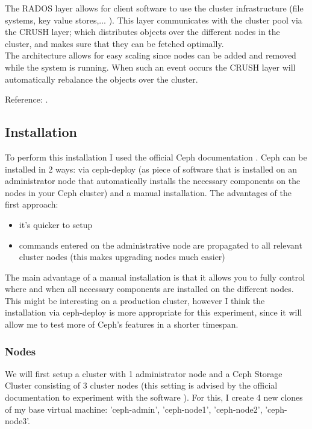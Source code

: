 \documentclass[12pt]{report}
\begin{document}
The RADOS layer allows for client software to use the cluster
infrastructure  (file systems, key value stores,... ). This layer
communicates with the cluster pool via the CRUSH layer; which
distributes objects over the different nodes in the cluster, and makes
sure that they can be fetched optimally. \\
The architecture allows for easy scaling since nodes can be added and
removed while the system is running. When such an event occurs the
CRUSH layer will automatically rebalance the objects over the cluster.

Reference: \cite{ceph_developerworks}.

\subsection{Installation}
To perform this installation I used the official Ceph documentation \cite{ceph_official_doc}.
Ceph can be installed in 2 ways: via ceph-deploy (as piece of software
that is installed on an administrator node that automatically installs the
necessary components on the nodes in your Ceph cluster) and a
manual installation.
The advantages of the first approach:
\begin{itemize}
\item it's quicker to setup
\item commands entered on the administrative node are 
  propagated to all relevant cluster nodes (this makes upgrading nodes
  much easier)
\end{itemize}
The main advantage of a manual installation is that it allows you to
fully control where and when all necessary components are installed on the different
nodes. 
This might be interesting on a production cluster, however I think the
installation via ceph-deploy is more appropriate for this experiment, since it will
allow me to test more of Ceph's features in a shorter timespan.

\subsubsection{Nodes}
We will first setup a cluster with 1 administrator node and a Ceph
Storage Cluster consisting of 3 cluster nodes (this setting is advised
by the official documentation to experiment with the software \cite{ceph_official_doc}).
For this, I create 4 new clones of my base virtual machine:
'ceph-admin', 'ceph-node1', 'ceph-node2', 'ceph-node3'.
\end{document}
